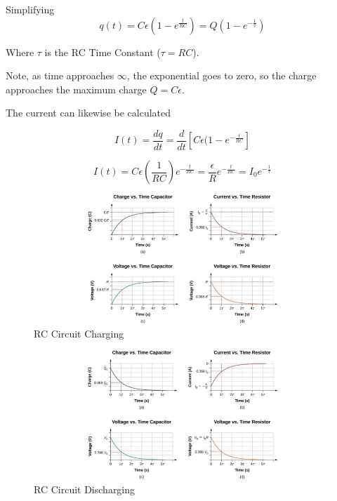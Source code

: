\documentclass[14pt]{memoir}
\begin{document}
Simplifying
\begin{equation}
q(t) = C\epsilon(1-e^{\frac{t}{RC}}) = Q(1-e^{-\frac{1}{\tau}})
\end{equation}

Where $\tau$ is the RC Time Constant ($\tau = RC$).

Note, as time approaches $\infty$, the exponential goes to zero, so the charge approaches the maximum charge $Q = C \epsilon$.

The current can likewise be calculated

\begin{equation}
I(t) = \frac{dq}{dt} = \frac{d}{dt} [C\epsilon(1-e^{-\frac{t}{RC}}]
\end{equation}

\begin{equation}
I(t) = C \epsilon (\frac{1}{RC}) e^{-\frac{t}{RC}} = \frac{\epsilon}{R}e^{-\frac{t}{RC}} = I_0 e^{-\frac{1}{\tau}}
\end{equation}

\begin{figure}[H]
\begin{center}
\includegraphics[scale=0.90]{fig/fig_10_39.jpg}
\caption{RC Circuit Charging}
\label{fig:10_39}
\end{center}
\end{figure}

\begin{figure}[H]
\begin{center}
\includegraphics[scale=0.90]{fig/fig_10_40.jpg}
\caption{RC Circuit Discharging}
\label{fig:10_40}
\end{center}
\end{figure}
\end{document}
